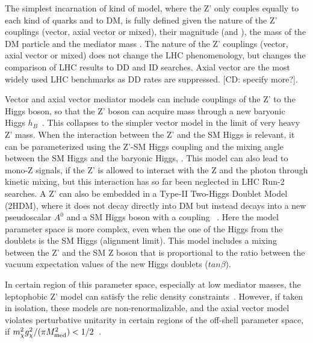 The simplest incarnation of kind of model, where the Z' only couples equally to each kind of quarks and to DM, is fully defined given the nature of the Z' couplings (vector, axial vector or mixed), their magnitude (\gq and \gDM), the mass of the DM particle \mdm and the mediator mass \mmed. The nature of the Z' couplings (vector, axial vector or mixed) does not change the LHC phenomenology, but changes the comparison of LHC results to DD and ID searches. Axial vector are the most widely used LHC benchmarks as DD rates are suppressed. [CD: specify more?]. 

Vector and axial vector mediator models can include couplings of the Z' to the Higgs boson, so that the Z' boson can acquire mass through a new baryonic Higgs $h_B$~\cite{Berlin:2014cfa}. This collapses to the simpler vector model in the limit of very heavy Z' mass. When the interaction between the Z' and the SM Higgs is relevant, it can be parameterized using the Z'-SM Higgs coupling \ghZprimeZprime and the mixing angle between the SM Higgs and the baryonic Higgs, \sinthetab. 
This model can also lead to mono-Z signals, if the Z' is allowed to interact with the Z and the photon through kinetic mixing, 
but this interaction has so far been neglected in LHC Run-2 searches. 
A Z' can also be embedded in a Type-II Two-Higgs Doublet Model (2HDM), where it does not decay directly into DM but instead decays into a new pseudoscalar $A^0$ and a SM Higgs boson with a coupling \gZprime~\cite{Berlin:2014cfa,Liew:2016oon}. Here the model parameter space is more complex, even when the one of the Higgs from the doublets is the SM Higgs (alignment limit). This model includes a mixing between the Z' and the SM Z boson that is proportional to the ratio between the vacuum expectation values of the new Higgs doublets ($tan \beta$). 

In certain region of this parameter space, especially at low mediator masses, the leptophobic Z' model can satisfy the relic density constraints~\cite{Chala:2015ama}. However, if taken in isolation, these models are  non-renormalizable, and the axial vector model violates perturbative unitarity in certain regions of the off-shell parameter space, if $m_{\chi}^2g_{\chi}^2/(\pi M_{\rm{med}}^2)<1/2$~\cite{Chala:2015ama,Kahlhoefer:2015bea,Boveia:2016mrp}. 

